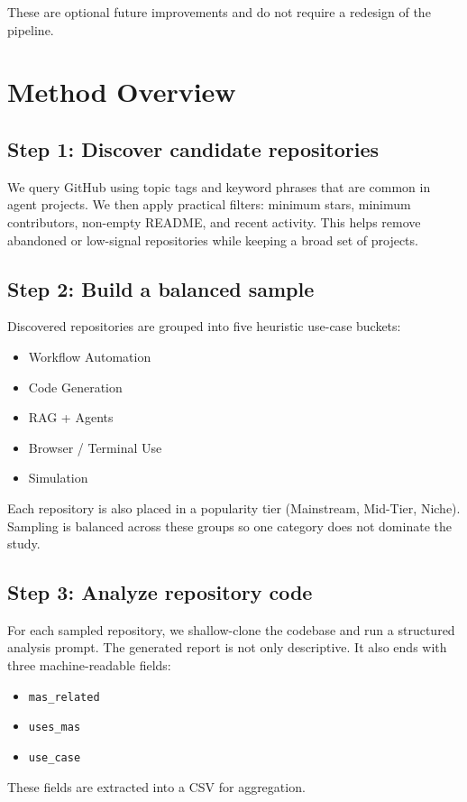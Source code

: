 \documentclass[12pt,a4paper,onecolumn]{article}
\begin{document}
These are optional future improvements and do not require a redesign of the pipeline.

\section{Method Overview}
\subsection{Step 1: Discover candidate repositories}
We query GitHub using topic tags and keyword phrases that are common in agent projects. We then apply practical filters: minimum stars, minimum contributors, non-empty README, and recent activity. This helps remove abandoned or low-signal repositories while keeping a broad set of projects.

\subsection{Step 2: Build a balanced sample}
Discovered repositories are grouped into five heuristic use-case buckets:
\begin{itemize}
  \item Workflow Automation
  \item Code Generation
  \item RAG + Agents
  \item Browser / Terminal Use
  \item Simulation
\end{itemize}

Each repository is also placed in a popularity tier (Mainstream, Mid-Tier, Niche). Sampling is balanced across these groups so one category does not dominate the study.

\subsection{Step 3: Analyze repository code}
For each sampled repository, we shallow-clone the codebase and run a structured analysis prompt. The generated report is not only descriptive. It also ends with three machine-readable fields:
\begin{itemize}
  \item \texttt{mas\_related}
  \item \texttt{uses\_mas}
  \item \texttt{use\_case}
\end{itemize}
These fields are extracted into a CSV for aggregation.
\end{document}
